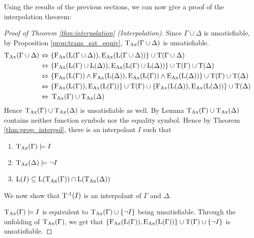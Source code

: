 		Using the results of the previous sections, we can now give a proof of the interpolation theorem:

		\begin{proof}[Proof of Theorem \ref{thm:interpolation} (Interpolation)]

			Since $\Gamma \cup \Delta$ is unsatisfiable,
			by Proposition \ref{prop:trans_sat_equiv}, $\TransAll(\Gamma \cup \Delta)$ is unsatisfiable.
			\begin{align*}
				\TransAll(\Gamma \cup \Delta)\,\liff~&\{\FAX(\Lang(\Gamma\cup\Delta)), \EAX(\Lang(\Gamma \cup\Delta))\} \cup \Trans(\Gamma \cup \Delta) \\
				\liff~&\{\FAX(\Lang(\Gamma)\cup\Lang(\Delta)), \EAX(\Lang(\Gamma)\cup\Lang(\Delta))\} \cup \Trans(\Gamma )\cup \Trans(\Delta) \\
				\liff~&\{\FAX(\Lang(\Gamma)) \land \FAX(\Lang(\Delta)), \EAX(\Lang(\Gamma)) \land \EAX(\Lang(\Delta))\} \cup \Trans(\Gamma) \cup \Trans(\Delta) \\
				\liff~&\{\FAX(\Lang(\Gamma)),\EAX(\Lang(\Gamma))\} \cup \Trans(\Gamma) \cup \{\FAX(\Lang(\Delta)), \EAX(\Lang(\Delta))\} \cup \Trans(\Delta) \\
				\liff~&\TransAll(\Gamma) \cup \TransAll(\Delta)
			\end{align*}
			Hence  $\TransAll(\Gamma) \cup \TransAll(\Delta)$ is unsatisfiable as well.
			By Lemma  $\TransAll(\Gamma) \cup \TransAll(\Delta)$ contains neither function symbols nor the equality symbol.
			Hence by Theorem \ref{thm:prop_interpol}, there is an interpolant $I$ such that
			\begin{enumerate}
				\item $\TransAll(\Gamma) \entails I$
				\item $\TransAll(\Delta) \entails \lnot I$ 
				\item $\Lang(I) \subseteq \Lang(\TransAll(\Gamma)) \cap \Lang(\TransAll(\Delta))$
					\label{proof:interpolation1_3}
			\end{enumerate}

			We now show that $\TransInv(I)$ is an interpolant of $\Gamma$ and $\Delta$.

			$\TransAll(\Gamma) \entails I$ is equivalent to $\TransAll(\Gamma) \cup \{\lnot I\}$ being unsatisfiable.
			Through the unfolding of $\TransAll(\Gamma)$, we get that 
			$\{\FAX(\Lang(\Gamma)), \EAX(\Lang(\Gamma))\} \cup \Trans(\Gamma) \cup \{\lnot I\}$ is unsatisfiable.


\end{proof}
